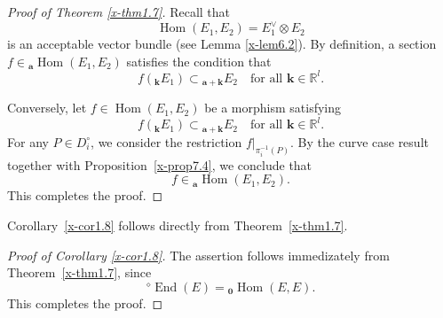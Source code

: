 \documentclass[12pt,twoside]{amsart}
\DeclareMathOperator{\End}{End}
\DeclareMathOperator{\Hom}{Hom}
\theoremstyle{definition}
\begin{document}
\begin{proof}[Proof of Theorem \ref{x-thm1.7}]
Recall that
\[
\Hom(E_1, E_2) = E_1^\vee \otimes E_2
\]
is an acceptable vector bundle (see Lemma \ref{x-lem6.2}).
By definition, a section
$f \in {}_{\bm a}\!\Hom(E_1, E_2)$
satisfies the condition that
\[
f({}_{\bm k}E_1) \subset {}_{\bm a + \bm k}E_2
\quad \text{for all } \bm k \in \mathbb{R}^l.
\]

Conversely, let
$f \in \Hom(E_1, E_2)$
be a morphism satisfying
\[
f({}_{\bm k}E_1) \subset {}_{\bm a + \bm k}E_2
\quad \text{for all } \bm k \in \mathbb{R}^l.
\]
For any $P \in D_i^\circ$, we consider the restriction
$f|_{\pi_i^{-1}(P)}$.
By the curve case result
\cite[Proposition~17.1]{fujino-fujisawa-ono}
together with Proposition~\ref{x-prop7.4},
we conclude that
\[
f \in {}_{\bm a}\!\Hom(E_1, E_2).
\] 
This completes the proof. 
\end{proof}

Corollary~\ref{x-cor1.8} follows 
directly from Theorem~\ref{x-thm1.7}.

\begin{proof}[Proof of Corollary \ref{x-cor1.8}]
The assertion follows immedizately from Theorem~\ref{x-thm1.7},
since
\[
{}^\diamond\!\End(E) = {}_{\bm 0}\!\Hom(E, E).
\] 
This completes the proof. 
\end{proof}
\end{document}

